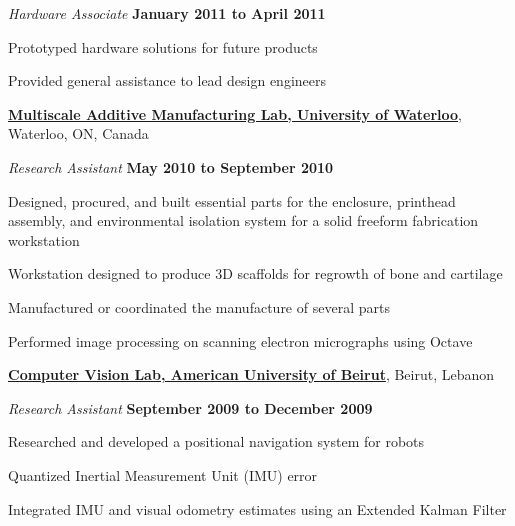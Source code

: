 \documentclass[10pt, a4paper]{article}
\begin{document}
\begin{outerlist}
\item[] \textit{Hardware Associate} \hfill \textbf{January 2011 to April 2011}
\begin{innerlist}
  \item Prototyped hardware solutions for future products
  \item Provided general assistance to lead design engineers
\end{innerlist}
\end{outerlist}

\halfblankline

\href{http://rpl.uwaterloo.ca/}{\textbf{Multiscale Additive Manufacturing Lab, University of Waterloo}}, Waterloo, ON, Canada

\begin{outerlist}
\item[] \textit{Research Assistant} \hfill \textbf{May 2010 to September 2010}
\begin{innerlist}
  \item Designed, procured, and built essential parts for the enclosure, printhead assembly, and environmental isolation system for a solid freeform fabrication workstation
  \item Workstation designed to produce 3D scaffolds for regrowth of bone and cartilage
  \item Manufactured or coordinated the manufacture of several parts
  \item Performed image processing on scanning electron micrographs using Octave
\end{innerlist}
\end{outerlist}

\halfblankline

\href{http://www.aub.edu.lb/fea/me/research_labs/cvl/Pages/home.aspx}{\textbf{Computer Vision Lab, American University of Beirut}}, Beirut, Lebanon

\begin{outerlist}
\item[] \textit{Research Assistant} \hfill \textbf{September 2009 to December 2009}
\begin{innerlist}
  \item Researched and developed a positional navigation system for robots
  \item Quantized Inertial Measurement Unit (IMU) error
  \item Integrated IMU and visual odometry estimates using an Extended Kalman Filter
\end{innerlist}
\end{outerlist}
\end{document}
